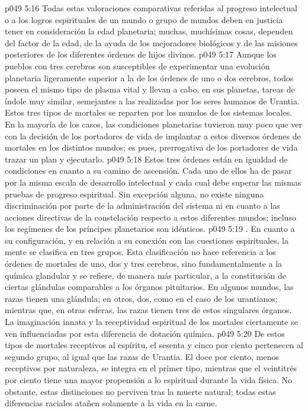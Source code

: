 \vs p049 5:16 Todas estas valoraciones comparativas referidas al progreso intelectual o a los logros espirituales de un mundo o grupo de mundos deben en justicia tener en consideración la edad planetaria; muchas, muchísimas cosas, dependen del factor de la edad, de la ayuda de los mejoradores biológicos y de las misiones posteriores de los diferentes órdenes de hijos divinos.
\vs p049 5:17 Aunque los pueblos con tres cerebros son susceptibles de experimentar una evolución planetaria ligeramente superior a la de los órdenes de uno o dos cerebros, todos poseen el mismo tipo de plasma vital y llevan a cabo, en sus planetas, tareas de índole muy similar, semejantes a las realizadas por los seres humanos de Urantia. Estos tres tipos de mortales se reparten por los mundos de los sistemas locales. En la mayoría de los casos, las condiciones planetarias tuvieron muy poco que ver con la decisión de los portadores de vida de implantar a estos diversos órdenes de mortales en los distintos mundos; es pues, prerrogativa de los portadores de vida trazar un plan y ejecutarlo.
\vs p049 5:18 Estos tres órdenes están en igualdad de condiciones en cuanto a su camino de ascensión. Cada uno de ellos ha de pasar por la misma escala de desarrollo intelectual y cada cual debe superar las mismas pruebas de progreso espiritual. Sin excepción alguna, no existe ninguna discriminación por parte de la administración del sistema ni en cuanto a las acciones directivas de la constelación respecto a estos diferentes mundos; incluso los regímenes de los príncipes planetarios son idénticos.
\vs p049 5:19 . En cuanto a su configuración, y en relación a su conexión con las cuestiones espirituales, la mente se clasifica en tres grupos. Esta clasificación no hace referencia a los órdenes de mortales de uno, dos y tres cerebros, sino fundamentalmente a la química glandular y se refiere, de manera más particular, a la constitución de ciertas glándulas comparables a los órganos pituitarios. En algunos mundos, las razas tienen una glándula; en otros, dos, como en el caso de los urantianos; mientras que, en otras esferas, las razas tienen tres de estos singulares órganos. La imaginación innata y la receptividad espiritual de los mortales ciertamente se ven influenciadas por esta diferencia de dotación química.
\vs p049 5:20 De estos tipos de mortales receptivos al espíritu, el sesenta y cinco por ciento pertenecen al segundo grupo, al igual que las razas de Urantia. El doce por ciento, menos receptivos por naturaleza, se integra en el primer tipo, mientras que el veintitrés por ciento tiene una mayor propensión a lo espiritual durante la vida física. No obstante, estas distinciones no perviven tras la muerte natural; todas estas diferencias raciales atañen solamente a la vida en la carne.
